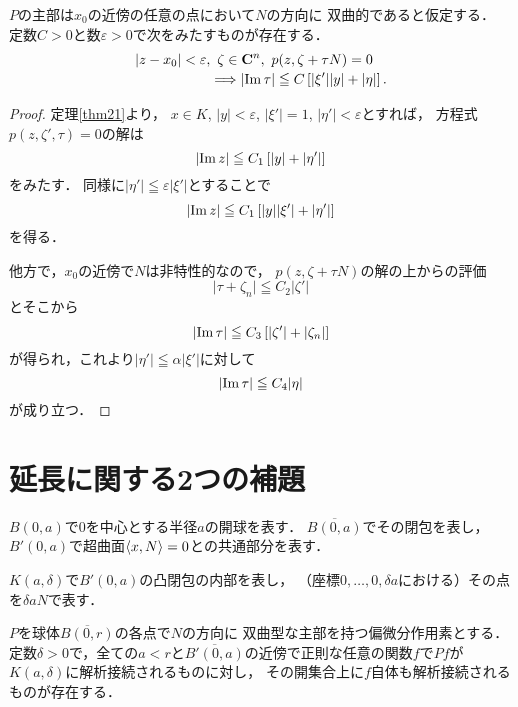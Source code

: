 \begin{THM}\label{thm23}
    \(P\)の主部は\(x_0\)の近傍の任意の点において\(N\)の方向に
    双曲的であると仮定する．
    定数\(C>0\)と数\(\varepsilon>0\)で次をみたすものが存在する．
    \[\begin{multlined}
        \lvert{z-x_0}\rvert<\varepsilon,\ 
        \zeta\in\cc^{n},\ 
        p(z,\zeta+\tau N)=0\\
        \Longrightarrow
        \lvert{\im{\tau}}\rvert
        \leqq
        C\left[\lvert{\xi'}\rvert\lvert{y}\rvert+\lvert{\eta}\rvert\right].
    \end{multlined}\]
\end{THM}

\begin{proof}
    定理\ref{thm21}より，
    \(x\in K\), \(\lvert{y}\rvert<\varepsilon\), 
    \(\lvert{\xi'}\rvert=1\), 
    \(\lvert{\eta'}\rvert<\varepsilon\)とすれば，
    方程式\(p(z,\zeta',\tau)=0\)の解は
    \[
        \lvert\mathop{\mathrm{Im}}\nolimits{z}\rvert
        \leqq 
        C_{1}\left[
            \lvert{y}\rvert+\lvert{\eta'}\rvert
        \right]
    \]をみたす．
    同様に\(
        \lvert{\eta'}\rvert
        \leqq\varepsilon\lvert\xi'\rvert
    \)とすることで\[
        \lvert\mathop{\mathrm{Im}}\nolimits{z}\rvert
        \leqq 
        C_{1}\left[
            \lvert{y}\rvert\lvert\xi'\rvert+\lvert{\eta'}\rvert
        \right]
    \]を得る．

    他方で，\(x_0\)の近傍で\(N\)は非特性的なので，
    \(p(z,\zeta+\tau N)\)の解の上からの評価\[
        \lvert{\tau+\zeta_n}\rvert\leqq C_2\lvert{\zeta'}\rvert
    \]とそこから\[
        \lvert{\mathop{\mathrm{Im}}\nolimits{\tau}}\rvert\leqq C_3\left[\lvert{\zeta'}\rvert+\lvert{\zeta_n}\rvert\right]
    \]が得られ，これより\(
        \lvert{\eta'}\rvert\leqq\alpha\lvert{\xi'}\rvert
    \)に対して\[
        \lvert{\mathop{\mathrm{Im}}\nolimits{\tau}}\rvert\leqq C_4\lvert{\eta}\rvert
    \]が成り立つ．
\end{proof}
\section{延長に関する2つの補題}
\(B(0,a)\)で\(0\)を中心とする半径\(a\)の開球を表す．
\(\overline{B(0,a)}\)でその閉包を表し，
\(B'(0,a)\)で超曲面\(\inner<x,N>=0\)との共通部分を表す．

\(K(a,\delta)\)で\(B'(0,a)\)の凸閉包の内部を表し，
（座標\(0,\dots,0,\delta a\)における）その点を\(\delta aN\)で表す．

\begin{LMM}
    \(P\)を球体\(\overline{B(0,r)}\)の各点で\(N\)の方向に
    双曲型な主部を持つ偏微分作用素とする．
    定数\(\delta>0\)で，全ての\(a<r\)と\(
        \overline{B'(0,a)}
    \)の近傍で正則な任意の関数\(f\)で\(Pf\)が\(K(a,\delta)\)に解析接続されるものに対し，
    その開集合上に\(f\)自体も解析接続されるものが存在する．
\end{LMM}


